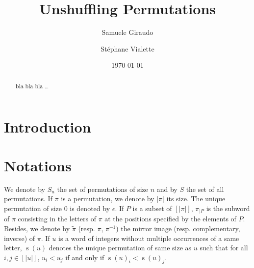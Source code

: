 \documentclass[a4paper,10pt]{llncs}
\DeclareMathOperator{\STD}{\mathrm{s}}
\begin{document}

\title{%
Unshuffling Permutations}%

\author{%
  Samuele Giraudo \and
  St\'ephane Vialette
}%
\date{\today}

\maketitle


\begin{abstract}
bla bla bla \ldots
\end{abstract}


\section{Introduction}
\label{section:Introduction}



\section{Notations}
\label{section:Notations}

We denote by $S_n$ the set of permutations of size $n$ and by $S$ the
set of all permutations. If $\pi$ is a permutation, we denote by $|\pi|$
its size. The unique permutation of size $0$ is denoted by $\epsilon$.
If $P$ is a subset of $[|\pi|]$, $\pi_{|P}$ is the subword of $\pi$
consisting in the letters of $\pi$ at the positions specified by the
elements of $P$. Besides, we denote by $\widetilde{\pi}$ (resp.
$\bar \pi$, $\pi^{-1}$) the mirror image (resp. complementary, inverse)
of $\pi$. If $u$ is a word of integers without multiple occurrences of a
same letter, $\STD(u)$ denotes the unique permutation of same size as
$u$ such that for all $i, j \in [|u|]$, $u_i < u_j$ if and only if
$\STD(u)_i < \STD(u)_j$.
\medskip
\end{document}
